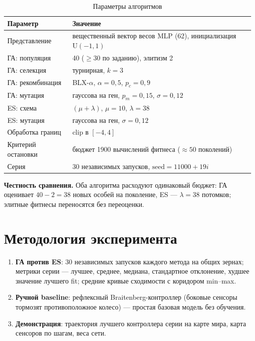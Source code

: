 \documentclass[12pt,a4paper]{article}
\begin{document}
\begin{table}[H]
\centering
\small
\caption{Параметры алгоритмов}
\label{tab:params}
\begin{tabular}{ll}
\toprule
Параметр & Значение \\
\midrule
Представление & вещественный вектор весов MLP (62), инициализация $\mathrm{U}(-1,1)$ \\
ГА: популяция & 40 ($\ge 30$ по заданию), элитизм 2 \\
ГА: селекция & турнирная, $k = 3$ \\
ГА: рекомбинация & BLX-$\alpha$, $\alpha = 0{,}5$, $p_c = 0{,}9$ \\
ГА: мутация & гауссова на ген, $p_m = 0{,}15$, $\sigma = 0{,}12$ \\
ES: схема & $(\mu+\lambda)$, $\mu = 10$, $\lambda = 38$ \\
ES: мутация & гауссова на ген, $\sigma = 0{,}12$ \\
Обработка границ & clip в $[-4, 4]$ \\
Критерий остановки & бюджет 1900 вычислений фитнеса ($\approx 50$ поколений) \\
Серия & 30 независимых запусков, $\text{seed} = 11000 + 19i$ \\
\bottomrule
\end{tabular}
\end{table}

\textbf{Честность сравнения.} Оба алгоритма расходуют одинаковый бюджет:
ГА оценивает $40 - 2 = 38$ новых особей на поколение, ES --- $\lambda = 38$
потомков; элитные фитнесы переносятся без переоценки.

\section{Методология эксперимента}

\begin{enumerate}
\item \textbf{ГА против ES}: 30 независимых запусков каждого метода на
  общих зернах; метрики серии --- лучшее, среднее, медиана, стандартное
  отклонение, худшее значение лучшего fit; средние кривые сходимости с
  коридором min--max.
\item \textbf{Ручной baseline}: рефлексный Braitenberg-контроллер
  (боковые сенсоры тормозят противоположное колесо) --- простая базовая
  модель без обучения.
\item \textbf{Демонстрация}: траектория лучшего контроллера серии на карте
  мира, карта сенсоров по шагам, веса сети.
\end{enumerate}
\end{document}
